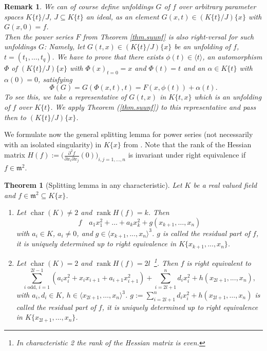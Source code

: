 \documentclass[11pt]{article}
\DeclareMathOperator{\rank}{rank}
\DeclareMathOperator{\rsim}{\stackrel{r}{\sim}}
\DeclareMathOperator{\Char}{char}
\newtheorem{Theorem}[Definition]{Theorem}
\newtheorem{Remark}[Definition]{Remark}
\newcommand{\fm}{\mathfrak{m}}
\begin{document}
\begin{Remark}\label{rm.unf}{\em
We can of course define unfoldings $G$ of $f$ over arbitrary parameter spaces $K\{t\}/J$, $J\subseteq K\{t\}$ an ideal, as  an element
$G(x,t)\in (K\{t\}/J)\{x\} $ with $G(x,0)=f$.\\
 Then the power series $F$ from Theorem \ref{thm.suunf} is also right-versal for such unfoldings $G$:
Namely, let $G(t,x)\in (K\{t\}/J)\{x\} $ be an unfolding of $f$, $t=(t_1,\ldots,t_q)$. 
 We have to prove that there exists $\phi(t)\in \langle t\rangle$,
an automorphism  $\Phi$ of $(K\{t\}/J)\{x\}$  with $\Phi(x)_{t=0} = x$ and
$\Phi(t) = t$ and
an $\alpha \in K\{t\}$ with  $\alpha(0)=0$, satisfying
\begin{equation}\label{def2}
 \Phi(G)= G(\Phi(x,t),t)  = F(x,\phi(t)) +\alpha(t).
\end{equation}
To see this, we take a representative of $G(t,x)$ in $K\{t,x\}$ which  is an unfolding of $f$ over $K\{t\}$. We apply  Theorem (\ref{thm.suunf}) to this representative and pass then to  $(K\{t\}/J)\{x\} $.
}
\end{Remark}

We formulate now the general splitting lemma for power series (not necessarily with an isolated singularity) in $K\{x\}$ from \cite{GP25a}. Note that  the rank of the Hessian matrix $H(f):=\Big( \frac{\partial^2 f}{\partial x_i\partial x_j}(0)\Big)_{i,j=1,...,n}$ is invariant under right equivalence if $f \in \fm^2$.

\begin{Theorem}[Splitting lemma in any characteristic]
\label{thm.split}
Let $K$ be a real valued field and $f \in \fm^2 \subseteq K\{x\}$.
\begin{enumerate}
\item Let $\Char(K) \ne2$ and   $\rank H(f)=k$. Then 
 $$ f\ \rsim \ a_1x_1^2+\ldots+a_kx_k^2+g(x_{k+1},\dots,x_n) $$
   with $a_i \in K$,  $a_i \ne 0$, and
$g\in\langle x_{k+1},...,x_n\rangle^3$.
   $g$ is called the {\em residual
    part\/} of $f$, it is uniquely determined up to   right equivalence in $K\{x_{k+1},...,x_n\}$.   
\item Let $\Char(K)=2$ and $\rank H(f)=2l$\ \footnote{In characteristic 2 the rank of the Hessian matrix is even.}. Then $f$ is right equivalent to 
$$ \sum_{i \text{ odd, } i=1}^{2l-1}(a_i x_i^2 + x_ix_{i+1} +
a_{i+1} x_{i+1}^2) + \sum_{i=2l+1}^{n}d_i x_i^2 + h(x_{2l+1},...,x_n),
$$
with  $a_i, d_i \in K$, $h\in \langle x_{2l+1},\ldots,x_{n} \rangle^3$. 
$g:=  \sum_{i=2l+1}^{n}d_i x_i^2  + h(x_{2l+1},\ldots,x_{n})$ is called the {\em residual part} of $f$, it is uniquely determined up to right equivalence in $K\{x_{2l+1},\ldots,x_{n}\}$.
\end{enumerate} 
\end{Theorem}
\end{document}
